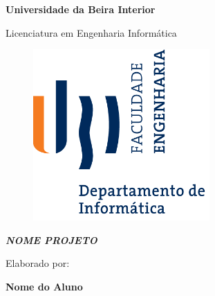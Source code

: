 
\thispagestyle{empty}
\setcounter{page}{-1}

\begin{center}
\begin{Huge}
\textbf{Universidade da Beira Interior}
\end{Huge}
\end{center}

\begin{center}
\begin{Huge}
Licenciatura em Engenharia Informática
\end{Huge}
\end{center}

\vspace{0,07cm}
\begin{figure}[!htb]
\centering
\includegraphics[width=191pt]{ubi-fe-di.png}
\end{figure}

\vspace{0.5cm}
\begin{center}
\begin{Large}
\textbf{\emph{NOME PROJETO}}
\end{Large}
\end{center}


\vspace{0.30cm}
\begin{center}
\begin{normalsize}
\begin{large}
Elaborado por:
\end{large}
\end{normalsize}
\end{center}

\vspace{0.15cm}
\begin{center}
\begin{large}
\textbf{Nome do Aluno}
\end{large}
\end{center}

